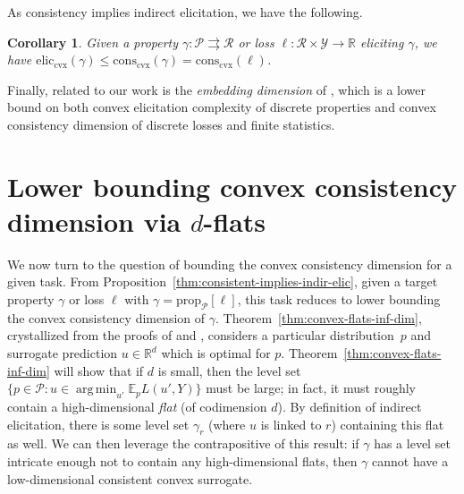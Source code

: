 \documentclass[11pt]{article} %
\newcommand{\Comments}{1}
\newcommand{\mytodo}[2]{\ifnum\Comments=1%
	\todo[linecolor=#1!80!black,backgroundcolor=#1,bordercolor=#1!80!black]{#2}\fi}
\newcommand{\jessiet}[1]{\mytodo{teal!20!white}{JF: #1}}
\newcommand{\reals}{\mathbb{R}}
\newcommand{\simplex}{\Delta_\Y}
\newcommand{\prop}[2][\mathcal{P}]{\mathrm{prop}_{#1}[#2]}
\newcommand{\eliccvx}{\mathrm{elic}_\mathrm{cvx}}
\newcommand{\conscvx}{\mathrm{cons}_\mathrm{cvx}}
\newcommand{\spn}{\mathrm{span}}
\newcommand{\affhull}{\mathrm{affhull}}
\newcommand{\E}{\mathbb{E}}
\newcommand{\R}{\mathcal{R}}
\renewcommand{\P}{\mathcal{P}}
\newcommand{\Y}{\mathcal{Y}}
\newcommand{\exploss}[3]{\E_{#3} #1(#2,Y)}
\newcommand{\toto}{\rightrightarrows}
\newtheorem{corollary}{Corollary}
\DeclareMathOperator*{\argmin}{arg\,min}
\begin{document}
As consistency implies indirect elicitation, we have the following.

\begin{corollary}\label{cor:elic-lb-consis-dim}
	Given a property $\gamma : \P \toto \R$ or loss $\ell:\R \times \Y \to \reals$ eliciting $\gamma$, we have $\eliccvx(\gamma) \leq \conscvx(\gamma) = \conscvx(\ell)$.
\end{corollary}

Finally, related to our work is the \emph{embedding dimension} of \citet{finocchiaro2020embedding}, which is a lower bound on both convex elicitation complexity of discrete properties and convex consistency dimension of discrete losses and finite statistics.




\section{Lower bounding convex consistency dimension via $d$-flats}\label{sec:char-convex}
We now turn to the question of bounding the convex consistency dimension for a given task.
From Proposition~\ref{thm:consistent-implies-indir-elic}, given a target property $\gamma$ or loss $\ell$ with $\gamma = \prop{\ell}$, this task reduces to lower bounding the convex consistency dimension of $\gamma$.
Theorem~\ref{thm:convex-flats-inf-dim}, crystallized from the proofs of \citet[Theorem 16]{ramaswamy2016convex} and \citet[Theorem 9]{agarwal2015consistent}, considers a particular distribution~$p$ and surrogate prediction $u \in \reals^d$ which is optimal for $p$.
Theorem~\ref{thm:convex-flats-inf-dim} will show that if $d$ is small, then the level set $\{p \in \P : u \in \argmin_{u'} \exploss{L}{u'}{p}\}$ must be large; in fact, it must roughly contain a high-dimensional \emph{flat} (of codimension $d$).
By definition of indirect elicitation, there is some level set $\gamma_r$ (where $u$ is linked to $r$) containing this flat as well.
We can then leverage the contrapositive of this result: if $\gamma$ has a level set intricate enough not to contain any high-dimensional flats, then $\gamma$ cannot have a low-dimensional consistent convex surrogate.

\end{document}

